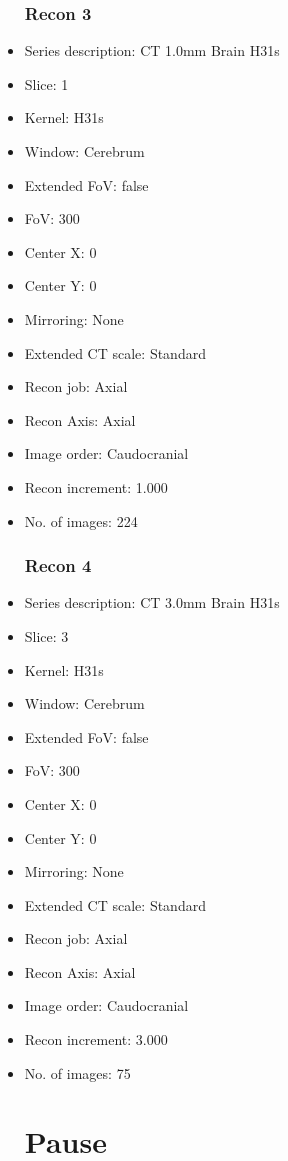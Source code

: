 \documentclass[12pt]{article}
\begin{document}
\begin{itemize}
\subsubsection{Recon 3}
\item Series description: CT 1.0mm Brain H31s
\item Slice: 1
\item Kernel: H31s
\item Window: Cerebrum
\item Extended FoV: false
\item FoV: 300
\item Center X: 0
\item Center Y: 0
\item Mirroring: None
\item Extended CT scale: Standard
\item Recon job: Axial
\item Recon Axis: Axial
\item Image order: Caudocranial
\item Recon increment: 1.000
\item No. of images: 224
\subsubsection{Recon 4}
\item Series description: CT 3.0mm Brain H31s
\item Slice: 3
\item Kernel: H31s
\item Window: Cerebrum
\item Extended FoV: false
\item FoV: 300
\item Center X: 0
\item Center Y: 0
\item Mirroring: None
\item Extended CT scale: Standard
\item Recon job: Axial
\item Recon Axis: Axial
\item Image order: Caudocranial
\item Recon increment: 3.000
\item No. of images: 75
\section{Pause}

\end{itemize}
\end{document}
